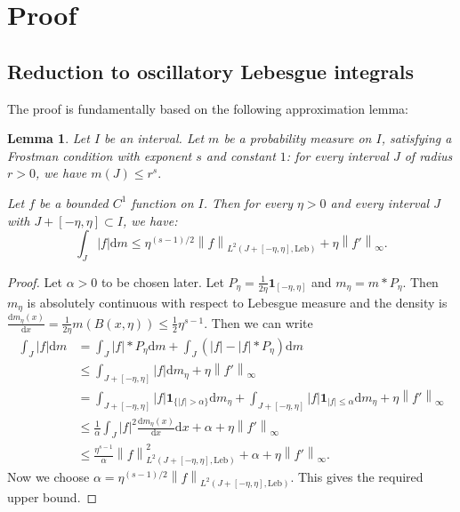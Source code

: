 \documentclass[12pt]{amsart}
\newcommand*\abs[1]{
	\left|#1\right|
}
\newcommand*\deriv{
	\mathrm{d}
}
\newcommand*\Leb{
	\mathrm{Leb}
}
\newcommand{\norm}[1]{\left\lVert#1\right\rVert}
\newtheorem{lem}{Lemma}[section]
\theoremstyle{definition}
\renewcommand{\leq}{\leqslant}
\begin{document}
\section{Proof}


\subsection{Reduction to oscillatory Lebesgue integrals}

The proof is fundamentally based on the following approximation lemma:
\begin{lem}\label{lma:approximation}
Let $I$ be an interval. Let $m$ be a probability measure on $I$, satisfying a Frostman condition with exponent $s$ and constant $1$: for every interval $J$ of radius $r > 0$, we have $m(J) \leq r^s.$ 

Let $f$ be a bounded $C^1$ function on $I$. Then for every $\eta > 0$ and every interval $J$ with $J + [-\eta, \eta] \subset I$, we have:
\[\int_J \abs{f}\deriv m \leq \eta^{(s - 1)/2}\norm{f}_{L^2(J + [-\eta,\eta], \Leb)} + \eta \norm{f'}_{\infty}.\]
\label{lem:approximation-measure}
\end{lem}

\begin{proof}
Let $\alpha > 0$ to be chosen later. Let $P_\eta = \frac{1}{2\eta}\mathbf{1}_{[-\eta, \eta]}$ and $m_\eta = m * P_\eta$. Then $m_\eta$ is absolutely continuous with respect to Lebesgue measure and the density is 
$\frac{\deriv m_\eta(x)}{\deriv x} = \frac{1}{2\eta}m(B(x, \eta))\leq\frac{1}{2}\eta^{s-1}.$ Then we can write
\begin{align*}
\int_J \abs{f}\deriv m
&= \int_J \abs{f}*P_\eta \deriv m + \int_J (\abs{f} - \abs{f}*P_\eta)\deriv m \\
&\leq \int_{J + [-\eta,\eta]}\abs{f}\deriv m_\eta +\eta\norm{f'}_\infty \\
&= \int_{J + [-\eta,\eta]} \abs{f}\mathbf{1}_{\{\abs{f} > \alpha\}} \deriv m_\eta + \int_{J + [-\eta,\eta]} \abs{f}\mathbf{1}_{\abs{f} \leq \alpha} \deriv m_\eta +  \eta\norm{f'}_\infty \\
&\leq \frac{1}{\alpha}\int_J \abs{f}^2 \frac{\deriv m_\eta(x)}{\deriv x}\deriv x + \alpha + \eta\norm{f'}_\infty \\
&\leq \frac{\eta^{s-1}}{\alpha}\norm{f}_{L^2(J + [-\eta,\eta], \Leb)}^2 + \alpha + \eta\norm{f'}_\infty.
\end{align*}
Now we choose $\alpha = \eta^{(s - 1)/2}\norm{f}_{L^2(J + [-\eta,\eta], \Leb)}$. This gives the required upper bound.
\end{proof}
\end{document}
